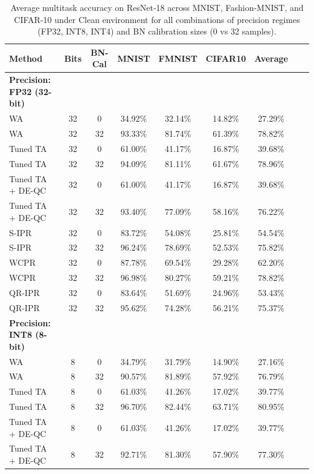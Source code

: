 \documentclass{article}
\theoremstyle{plain}
\theoremstyle{definition}
\theoremstyle{remark}
\begin{document}
\begin{table}[t]
\caption{Average multitask accuracy on ResNet-18 across MNIST, Fashion-MNIST, and CIFAR-10 under Clean environment for all combinations of precision regimes (FP32, INT8, INT4) and BN calibration sizes (0 vs 32 samples).}
\label{tab:main_results}
\begin{center}
\begin{small}
\begin{sc}
\begin{tabular}{lcccccccc}
\toprule
Method & Bits & BN-Cal & MNIST & FMNIST & CIFAR10 & Average \\
\midrule
\textbf{Precision: FP32 (32-bit)} & & & & & & \\
WA & 32 & 0 & 34.92\% & 32.14\% & 14.82\% & 27.29\% \\
WA & 32 & 32 & 93.33\% & 81.74\% & 61.39\% & 78.82\% \\
Tuned TA & 32 & 0 & 61.00\% & 41.17\% & 16.87\% & 39.68\% \\
Tuned TA & 32 & 32 & 94.09\% & 81.11\% & 61.67\% & 78.96\% \\
Tuned TA + DE-QC & 32 & 0 & 61.00\% & 41.17\% & 16.87\% & 39.68\% \\
Tuned TA + DE-QC & 32 & 32 & 93.40\% & 77.09\% & 58.16\% & 76.22\% \\
S-IPR & 32 & 0 & 83.72\% & 54.08\% & 25.81\% & 54.54\% \\
S-IPR & 32 & 32 & 96.24\% & 78.69\% & 52.53\% & 75.82\% \\
WCPR & 32 & 0 & 87.78\% & 69.54\% & 29.28\% & 62.20\% \\
WCPR & 32 & 32 & 96.98\% & 80.27\% & 59.21\% & 78.82\% \\
QR-IPR & 32 & 0 & 83.64\% & 51.69\% & 24.96\% & 53.43\% \\
QR-IPR & 32 & 32 & 95.62\% & 74.28\% & 56.21\% & 75.37\% \\
\midrule
\textbf{Precision: INT8 (8-bit)} & & & & & & \\
WA & 8 & 0 & 34.79\% & 31.79\% & 14.90\% & 27.16\% \\
WA & 8 & 32 & 90.57\% & 81.89\% & 57.92\% & 76.79\% \\
Tuned TA & 8 & 0 & 61.03\% & 41.26\% & 17.02\% & 39.77\% \\
Tuned TA & 8 & 32 & 96.70\% & 82.44\% & 63.71\% & 80.95\% \\
Tuned TA + DE-QC & 8 & 0 & 61.03\% & 41.26\% & 17.02\% & 39.77\% \\
Tuned TA + DE-QC & 8 & 32 & 92.71\% & 81.30\% & 57.90\% & 77.30\% \\

\end{tabular}
\end{sc}
\end{small}
\end{center}
\end{table}
\end{document}
